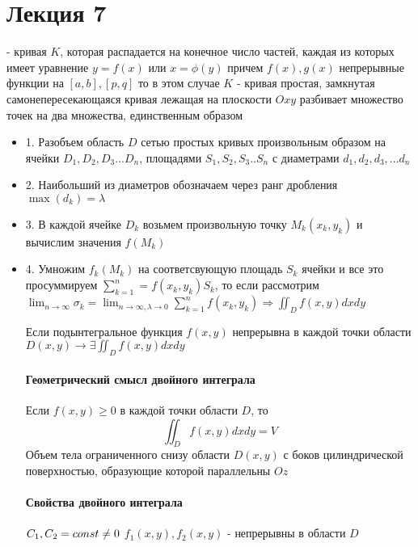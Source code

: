 \chapter{Лекция 7}

 - кривая $K$, которая распадается на конечное число частей, каждая из которых имеет уравнение $y=f(x)$ или $x=\phi(y)$ причем $f(x), g(x)$ непрерывные функции на $[a,b], [p, q]$ то в этом случае $K $ - кривая простая, замкнутая самонепересекающаяся кривая лежащая на плоскости $Oxy$ разбивает множество точек на два множества, единственным образом

\begin{itemize}
    \item 1. Разобъем область $D$ сетью простых кривых произвольным образом на ячейки $D_1, D_2, D_3... D_n$, площадями $S_1, S_2, S_3 .. S_n$ с диаметрами $d_1, d_2, d_3, ... d_n$
    \item 2. Наибольший из диаметров обозначаем через ранг дробления $\max(d_k) = \lambda$
    \item 3. В каждой ячейке $D_k$ возьмем произвольную точку $M_k(x_k, y_k)$ и вычислим значения $f(M_k)$
    \item 4. Умножим $f_k(M_k)$ на соответсвующую площадь $S_k$ ячейки и все это просуммируем $\sum_{k=1}^n = f(x_k, y_k) S_k$, то если рассмотрим $\lim_{n\rightarrow\infty} \sigma_k = \lim_{n\rightarrow\infty, \lambda \rightarrow 0} \sum_{k=1}^n f(x_k, y_k) \Rightarrow \iint_D f(x,y) dxdy$
    \begin{theorem}
        Если подынтегральное функция $f(x,y)$ непрерывна в каждой точки области $D(x,y) \rightarrow \exists \iint_D f(x,y)dxdy$
    \end{theorem}
    \subsubsection{Геометрический смысл двойного интеграла}
    Если $f(x,y) \ge 0$ в каждой точки области $D$, то 
    $$\iint_D f(x,y) dxdy = V$$
    Объем тела ограниченного снизу области $D(x,y)$ с боков цилиндрической поверхностью, образующие которой параллельны $Oz$

    \subsubsection{Свойства двойного интеграла}
    $C_1, C_2 = const \ne 0 \\ $
    $f_1(x,y), f_2(x,y)$ - непрерывны в области $D$


\end{itemize}
